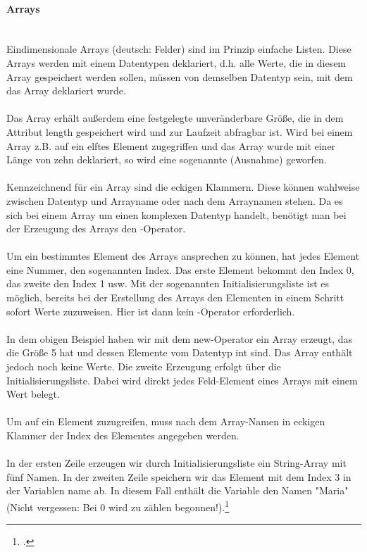 \paragraph{Arrays}\ \\
Eindimensionale Arrays (deutsch: Felder) sind im Prinzip einfache Listen. Diese Arrays werden mit einem Datentypen deklariert, d.h. alle Werte, die in diesem Array gespeichert werden sollen, müssen von demselben Datentyp sein, mit dem das Array deklariert wurde.\\
\\
Das Array erhält außerdem eine festgelegte unveränderbare Größe, die in dem Attribut length gespeichert wird und zur Laufzeit abfragbar ist. Wird bei einem Array z.B. auf ein elftes Element zugegriffen und das Array wurde mit einer Länge von zehn deklariert, so wird eine sogenannte  (Ausnahme) geworfen. \\
\\
Kennzeichnend für ein Array sind die eckigen Klammern. Diese können wahlweise zwischen Datentyp und Arrayname oder nach dem Arraynamen stehen. Da es sich bei einem Array um einen komplexen Datentyp handelt, benötigt man bei der Erzeugung des Arrays den -Operator.\\
\\
Um ein bestimmtes Element des Arrays ansprechen zu können, hat jedes Element eine Nummer, den sogenannten Index. Das erste Element bekommt den Index 0, das zweite den Index 1 usw. Mit der sogenannten Initialisierungsliste ist es möglich, bereits bei der Erstellung des Arrays den Elementen in einem Schritt sofort Werte zuzuweisen. Hier ist dann kein -Operator erforderlich.\\

\ \\
In dem obigen Beispiel haben wir mit dem new-Operator ein Array erzeugt, das die Größe 5 hat und dessen Elemente vom Datentyp int sind. Das Array enthält jedoch noch keine Werte. Die zweite Erzeugung erfolgt über die  Initialisierungsliste. Dabei wird direkt jedes Feld-Element eines Arrays mit einem Wert belegt.\\
\\
Um auf ein Element zuzugreifen, muss nach dem Array-Namen in eckigen Klammer der Index des Elementes angegeben werden.\\

\ \\
In der ersten Zeile erzeugen wir durch Initialisierungsliste ein String-Array mit fünf Namen. In der zweiten Zeile speichern wir das Element mit dem Index 3 in der Variablen name ab. In diesem Fall enthält die Variable den Namen "Maria" (Nicht vergessen: Bei 0 wird zu zählen begonnen!).\footcite{shit_java_tut}